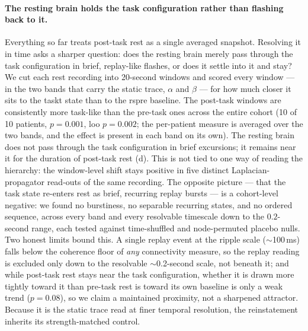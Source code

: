 \paragraph{The resting brain holds the task configuration rather than flashing back to it.}
Everything so far treats post-task rest as a single averaged snapshot. Resolving it in time asks a sharper question: does the resting brain merely pass through the task configuration in brief, replay-like flashes, or does it settle into it and stay? We cut each rest recording into 20-second windows and scored every window --- in the two bands that carry the static trace, \(\alpha\) and \(\beta\) --- for how much closer it sits to the \acrshort{taskt} state than to the \acrshort{rspre} baseline. The post-task windows are consistently more task-like than the pre-task ones across the entire cohort (10 of 10 patients, \(p = 0.001\), \gls{loo} \(p = 0.002\); the per-patient measure is averaged over the two bands, and the effect is present in each band on its own). The resting brain does not pass through the task configuration in brief excursions; it remains near it for the duration of post-task rest (d). This is not tied to one way of reading the hierarchy: the window-level shift stays positive in five distinct Laplacian-propagator read-outs of the same recording. The opposite picture --- that the task state re-enters rest as brief, recurring replay bursts --- is a cohort-level negative: we found no burstiness, no separable recurring states, and no ordered sequence, across every band and every resolvable timescale down to the \(0.2\)-second range, each tested against time-shuffled and node-permuted placebo nulls. Two honest limits bound this. A single replay event at the ripple scale (\(\sim\)100\,ms) falls below the coherence floor of \emph{any} connectivity measure, so the replay reading is excluded only down to the resolvable \(\sim\)0.2-second scale, not beneath it; and while post-task rest stays near the task configuration, whether it is drawn more tightly toward it than pre-task rest is toward its own baseline is only a weak trend (\(p = 0.08\)), so we claim a maintained proximity, not a sharpened attractor. Because it is the static trace read at finer temporal resolution, the reinstatement inherits its strength-matched control.
